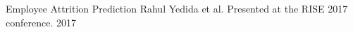 \begin{cvhonors}
  \cvhonor
    {Employee Attrition Prediction}
    {Rahul Yedida et al. Presented at the RISE 2017 conference.}
    {}
    {2017}

\end{cvhonors}